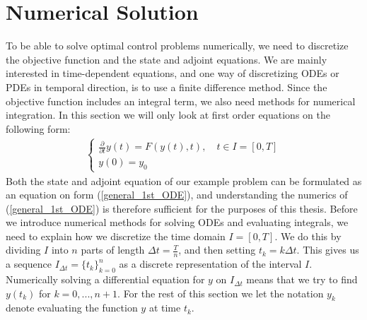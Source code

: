 \section{Numerical Solution}
To be able to solve optimal control problems numerically, we need to discretize the objective function and the state and adjoint equations. We are mainly interested in time-dependent equations, and one way of discretizing ODEs or PDEs in temporal direction, is to use a finite difference method. Since the objective function includes an integral term, we also need methods for numerical integration. In this section we will only look at first order equations on the following form:
\begin{align}
\left\{
     \begin{array}{lr}
	\frac{\partial}{\partial t} y(t) = F(y(t),t),\quad t\in I=[0,T] \\
	y(0)=y_0 
	\end{array}
\right.\label{general_1st_ODE}
\end{align}
Both the state and adjoint equation of our example problem can be formulated as an equation on form (\ref{general_1st_ODE}), and understanding the numerics of (\ref{general_1st_ODE}) is therefore sufficient for the purposes of this thesis. Before we introduce numerical methods for solving ODEs and evaluating integrals, we need to explain how we discretize the time domain $I=[0,T]$. We do this by dividing $I$ into $n$ parts of length $\Delta t=\frac{T}{n}$, and then setting $t_k=k\Delta t$. This gives us a sequence $I_{\Delta t}=\{t_k\}_{k=0}^{n}$ as a discrete representation of the interval $I$. Numerically solving a differential equation for $y$ on $I_{\Delta t}$ means that we try to find $y(t_k)$ for $k=0,...,n+1$. For the rest of this section we let the notation $y_k$ denote evaluating the function $y$ at time $t_k$.
